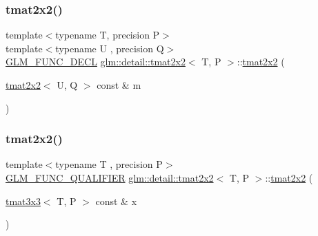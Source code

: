 \mbox{\label{structglm_1_1detail_1_1tmat2x2_a6a9b44f5626983a1f66171f8cecfbc8f}} 
\subsubsection{\texorpdfstring{tmat2x2()}{tmat2x2()}\hspace{0.1cm}{\footnotesize\ttfamily [10/22]}}
{\footnotesize\ttfamily template$<$typename T, precision P$>$ \\
template$<$typename U , precision Q$>$ \\
\hyperlink{setup_8hpp_ab2d052de21a70539923e9bcbf6e83a51}{G\+L\+M\+\_\+\+F\+U\+N\+C\+\_\+\+D\+E\+CL} \hyperlink{structglm_1_1detail_1_1tmat2x2}{glm\+::detail\+::tmat2x2}$<$ T, P $>$\+::\hyperlink{structglm_1_1detail_1_1tmat2x2}{tmat2x2} (\begin{DoxyParamCaption}\item[{\hyperlink{structglm_1_1detail_1_1tmat2x2}{tmat2x2}$<$ U, Q $>$ const \&}]{m }\end{DoxyParamCaption})\hspace{0.3cm}{\ttfamily [explicit]}}

\mbox{\label{structglm_1_1detail_1_1tmat2x2_a291750bdcaf39932f079105ca4dd6633}} 
\subsubsection{\texorpdfstring{tmat2x2()}{tmat2x2()}\hspace{0.1cm}{\footnotesize\ttfamily [11/22]}}
{\footnotesize\ttfamily template$<$typename T , precision P$>$ \\
\hyperlink{setup_8hpp_a33fdea6f91c5f834105f7415e2a64407}{G\+L\+M\+\_\+\+F\+U\+N\+C\+\_\+\+Q\+U\+A\+L\+I\+F\+I\+ER} \hyperlink{structglm_1_1detail_1_1tmat2x2}{glm\+::detail\+::tmat2x2}$<$ T, P $>$\+::\hyperlink{structglm_1_1detail_1_1tmat2x2}{tmat2x2} (\begin{DoxyParamCaption}\item[{\hyperlink{structglm_1_1detail_1_1tmat3x3}{tmat3x3}$<$ T, P $>$ const \&}]{x }\end{DoxyParamCaption})\hspace{0.3cm}{\ttfamily [explicit]}}



